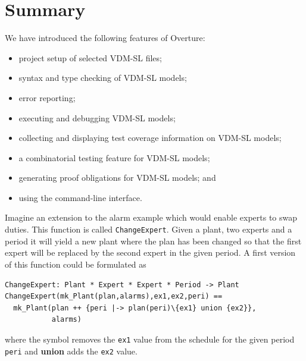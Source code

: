 {\lstset{style=mystyle,language=VDM-SL}

\section{Summary}

We have introduced the following features of Overture:
\begin{itemize}
\item project setup of selected VDM-SL files;
\item syntax and type checking of VDM-SL models;
\item error reporting;
\item executing and debugging VDM-SL models; 
\item collecting and displaying test coverage information on VDM-SL
  models;
\item a combinatorial testing feature for VDM-SL models;
\item generating proof obligations for VDM-SL models; and
\item using the command-line interface. 
\end{itemize}


\begin{myhardexercise}
\label{ex:tool-alarm} Imagine an extension to the alarm example which
would enable experts to swap duties. This function is called
\texttt{ChangeExpert}. Given a plant, two experts and a period it will
yield a new plant where the plan has been changed so that the first
expert will be replaced by the second expert in the given period. A
first version of this function could be formulated as
\begin{lstlisting}
ChangeExpert: Plant * Expert * Expert * Period -> Plant
ChangeExpert(mk_Plant(plan,alarms),ex1,ex2,peri) ==
  mk_Plant(plan ++ {peri |-> plan(peri)\{ex1} union {ex2}},
           alarms)
\end{lstlisting}
\noindent where the \texttt{\SETDIFF} symbol removes the \texttt{ex1}
value from the schedule for the given period \texttt{peri} and
{\bf\ttfamily union} adds the \texttt{ex2} value.


\end{myhardexercise}}
